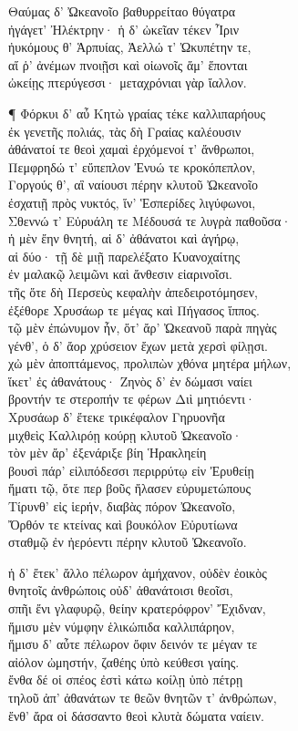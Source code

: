 \quad{}Θαύμας δ' Ὠκεανοῖο βαθυρρείταο θύγατρα \\
ἠγάγετ' Ἠλέκτρην· ἡ δ' ὠκεῖαν τέκεν Ἶριν \\
ἠυκόμους θ' Ἁρπυίας, Ἀελλώ τ' Ὠκυπέτην τε, \\
αἵ ῥ' ἀνέμων πνοιῇσι καὶ οἰωνοῖς ἅμ' ἕπονται\\
ὠκείῃς πτερύγεσσι· μεταχρόνιαι γὰρ ἴαλλον. 

¶ Φόρκυι δ' αὖ Κητὼ γραίας τέκε καλλιπαρήους \\
ἐκ γενετῆς πολιάς, τὰς δὴ Γραίας καλέουσιν\\
ἀθάνατοί τε θεοὶ χαμαὶ ἐρχόμενοί τ' ἄνθρωποι,\\
Πεμφρηδώ τ' εὔπεπλον Ἐνυώ τε κροκόπεπλον,\\
Γοργούς θ', αἳ ναίουσι πέρην κλυτοῦ Ὠκεανοῖο\\
ἐσχατιῇ πρὸς νυκτός, ἵν' Ἑσπερίδες λιγύφωνοι, \\
Σθεννώ τ' Εὐρυάλη τε Μέδουσά τε λυγρὰ παθοῦσα· \\
ἡ μὲν ἔην θνητή, αἱ δ' ἀθάνατοι καὶ ἀγήρῳ, \\
αἱ δύο· τῇ δὲ μιῇ παρελέξατο Κυανοχαίτης \\
ἐν μαλακῷ λειμῶνι καὶ ἄνθεσιν εἰαρινοῖσι. \\
τῆς ὅτε δὴ Περσεὺς κεφαλὴν ἀπεδειροτόμησεν,  \\
ἐξέθορε Χρυσάωρ τε μέγας καὶ Πήγασος ἵππος.\\
τῷ μὲν ἐπώνυμον ἦν, ὅτ' ἄρ' Ὠκεανοῦ παρὰ πηγὰς\\
γένθ', ὁ δ' ἄορ χρύσειον ἔχων μετὰ χερσὶ φίλῃσι. \\
χὠ μὲν ἀποπτάμενος, προλιπὼν χθόνα μητέρα μήλων,\\
ἵκετ' ἐς ἀθανάτους· Ζηνὸς δ' ἐν δώμασι ναίει  \\
βροντήν τε στεροπήν τε φέρων Διὶ μητιόεντι·\\
Χρυσάωρ δ' ἔτεκε τρικέφαλον Γηρυονῆα\\
μιχθεὶς Καλλιρόῃ κούρῃ κλυτοῦ Ὠκεανοῖο· \\
τὸν μὲν ἄρ' ἐξενάριξε βίη Ἡρακληείη\\
βουσὶ πάρ' εἰλιπόδεσσι περιρρύτῳ εἰν Ἐρυθείῃ \\
ἤματι τῷ, ὅτε περ βοῦς ἤλασεν εὐρυμετώπους \\
Τίρυνθ' εἰς ἱερήν, διαβὰς πόρον Ὠκεανοῖο, \\
Ὄρθόν τε κτείνας καὶ βουκόλον Εὐρυτίωνα\\
σταθμῷ ἐν ἠερόεντι πέρην κλυτοῦ Ὠκεανοῖο.

\quad{}ἡ δ' ἔτεκ' ἄλλο πέλωρον ἀμήχανον, οὐδὲν ἐοικὸς  \\
θνητοῖς ἀνθρώποις οὐδ' ἀθανάτοισι θεοῖσι, \\
σπῆι ἔνι γλαφυρῷ, θείην κρατερόφρον' Ἔχιδναν, \\
ἥμισυ μὲν νύμφην ἑλικώπιδα καλλιπάρηον, \\
ἥμισυ δ' αὖτε πέλωρον ὄφιν δεινόν τε μέγαν τε\\
αἰόλον ὠμηστήν, ζαθέης ὑπὸ κεύθεσι γαίης.  \\
ἔνθα δέ οἱ σπέος ἐστὶ κάτω κοίλῃ ὑπὸ πέτρῃ\\
τηλοῦ ἀπ' ἀθανάτων τε θεῶν θνητῶν τ' ἀνθρώπων,\\
ἔνθ' ἄρα οἱ δάσσαντο θεοὶ κλυτὰ δώματα ναίειν.

